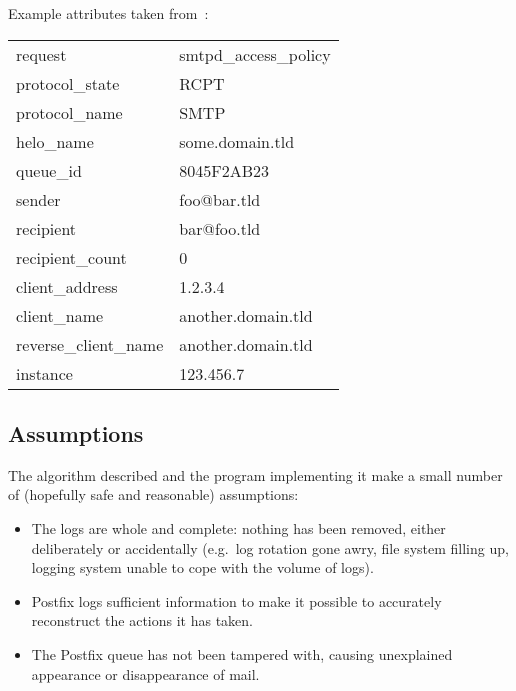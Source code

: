 \documentclass[a4paper,12pt,draft]{article}
\begin{document}
Example attributes taken from~\cite{policy-servers}:

\begin{tabular}[]{ll}

    request                 & smtpd\_access\_policy     \\
    protocol\_state         & RCPT                      \\
    protocol\_name          & SMTP                      \\
    helo\_name              & some.domain.tld           \\
    queue\_id               & 8045F2AB23                \\
    sender                  & foo@bar.tld               \\
    recipient               & bar@foo.tld               \\
    recipient\_count        & 0                         \\
    client\_address         & 1.2.3.4                   \\
    client\_name            & another.domain.tld        \\
    reverse\_client\_name   & another.domain.tld        \\
    instance                & 123.456.7                 \\

\end{tabular}



\subsection{Assumptions}

The algorithm described and the program implementing it make a small number
of (hopefully safe and reasonable) assumptions:

\begin{itemize}

    \item The logs are whole and complete: nothing has been removed, either
        deliberately or accidentally (e.g.\ log rotation gone awry, file
        system filling up, logging system unable to cope with the volume of
        logs).

    \item Postfix logs sufficient information to make it possible to
        accurately reconstruct the actions it has taken.

    \item The Postfix queue has not been tampered with, causing unexplained
        appearance or disappearance of mail.

\end{itemize}
\end{document}
